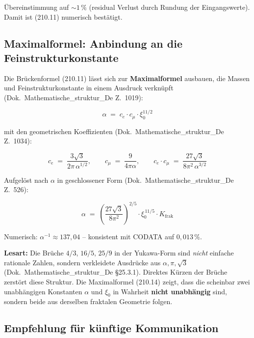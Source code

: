 Übereinstimmung auf $\sim 1\,\%$ (residual Verlust durch Rundung der
Eingangswerte). Damit ist (210.11) numerisch bestätigt.

\subsection*{Maximalformel: Anbindung an die Feinstrukturkonstante}

Die Brückenformel (210.11) lässt sich zur \textbf{Maximalformel}
ausbauen, die Massen und Feinstrukturkonstante in einem Ausdruck
verknüpft (Dok.~Mathematische\_struktur\_De Z.~1019):

\begin{equation}
  \boxed{\;\alpha \;=\; c_e \cdot c_\mu \cdot \xi_0^{11/2}\;}
  \tag{210.12}
\end{equation}

mit den geometrischen Koeffizienten (Dok.~Mathematische\_struktur\_De
Z.~1034):

\begin{equation}
  c_e \;=\; \frac{3\sqrt{3}}{2\pi\,\alpha^{1/2}},
  \qquad
  c_\mu \;=\; \frac{9}{4\pi\alpha},
  \qquad
  c_e \cdot c_\mu \;=\; \frac{27\sqrt{3}}{8\pi^2\,\alpha^{3/2}}
  \tag{210.13}
\end{equation}

Aufgelöst nach $\alpha$ in geschlossener Form
(Dok.~Mathematische\_struktur\_De Z.~526):

\begin{equation}
  \boxed{\;\alpha \;=\; \left(\frac{27\sqrt{3}}{8\pi^2}\right)^{2/5}
  \cdot \xi_0^{\,11/5} \cdot K_{\text{frak}}\;}
  \tag{210.14}
\end{equation}

Numerisch: $\alpha^{-1} \approx 137{,}04$ -- konsistent mit CODATA
auf $0{,}013\,\%$.

\textbf{Lesart:} Die Brüche $4/3$, $16/5$, $25/9$ in der
Yukawa-Form sind \emph{nicht} einfache rationale Zahlen, sondern
verkleidete Ausdrücke aus $\alpha, \pi, \sqrt{3}$
(Dok.~Mathematische\_struktur\_De §25.3.1). Direktes Kürzen der
Brüche zerstört diese Struktur. Die Maximalformel (210.14) zeigt,
dass die scheinbar zwei unabhängigen Konstanten $\alpha$ und $\xi_0$
in Wahrheit \textbf{nicht unabhängig} sind, sondern beide aus
derselben fraktalen Geometrie folgen.

\subsection*{Empfehlung für künftige Kommunikation}

